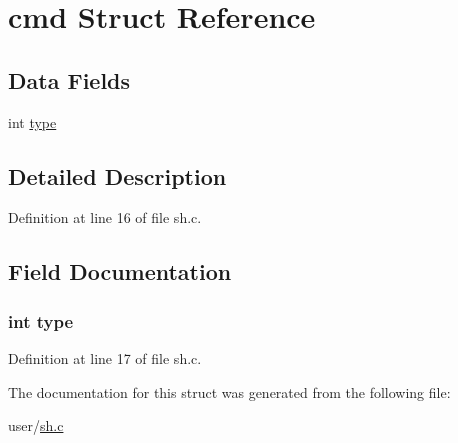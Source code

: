 \hypertarget{structcmd}{\section{cmd Struct Reference}
\label{structcmd}
}
\subsection*{Data Fields}
\begin{DoxyCompactItemize}
\item 
int \hyperlink{structcmd_ac765329451135abec74c45e1897abf26}{type}
\end{DoxyCompactItemize}


\subsection{Detailed Description}


Definition at line 16 of file sh.\-c.



\subsection{Field Documentation}
\hypertarget{structcmd_ac765329451135abec74c45e1897abf26}{
\subsubsection[{type}]{\setlength{\rightskip}{0pt plus 5cm}int type}}\label{structcmd_ac765329451135abec74c45e1897abf26}


Definition at line 17 of file sh.\-c.



The documentation for this struct was generated from the following file\-:\begin{DoxyCompactItemize}
\item 
user/\hyperlink{sh_8c}{sh.\-c}\end{DoxyCompactItemize}
